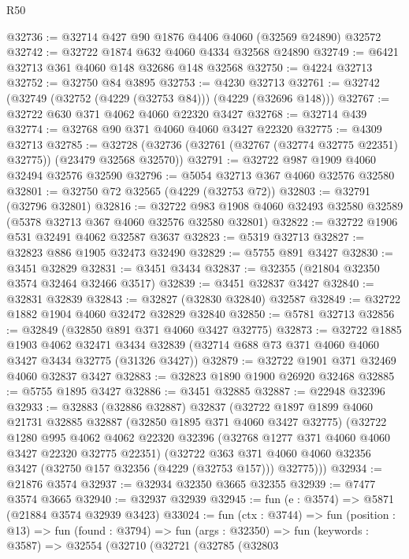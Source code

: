 \begin{lexlean}{R50}
\begin{coremodule}
@32736 := @32714 @427 @90 @1876 @4406 @4060 (@32569 @24890) @32572
@32742 := @32722 @1874 @632 @4060 @4334 @32568 @24890
@32749 := @6421 @32713 @361 @4060 @148 @32686 @148 @32568
@32750 := @4224 @32713
@32752 := @32750 @84 @3895
@32753 := @4230 @32713
@32761 := @32742 (@32749 (@32752 (@4229 (@32753 @84))) (@4229 (@32696 @148)))
@32767 := @32722 @630 @371 @4062 @4060 @22320 @3427
@32768 := @32714 @439
@32774 := @32768 @90 @371 @4060 @4060 @3427 @22320
@32775 := @4309 @32713
@32785 := @32728 (@32736 (@32761 (@32767 (@32774 @32775 @22351) @32775)) (@23479 @32568 @32570))
@32791 := @32722 @987 @1909 @4060 @32494 @32576 @32590
@32796 := @5054 @32713 @367 @4060 @32576 @32580
@32801 := @32750 @72 @32565 (@4229 (@32753 @72))
@32803 := @32791 (@32796 @32801)
@32816 := @32722
    @983
    @1908
    @4060
    @32493
    @32580
    @32589
    (@5378 @32713 @367 @4060 @32576 @32580 @32801)
@32822 := @32722 @1906 @531 @32491 @4062 @32587 @3637
@32823 := @5319 @32713
@32827 := @32823 @886 @1905 @32473 @32490
@32829 := @5755 @891 @3427
@32830 := @3451 @32829
@32831 := @3451 @3434
@32837 := @32355 (@21804 @32350 @3574 @32464 @32466 @3517)
@32839 := @3451 @32837 @3427
@32840 := @32831 @32839
@32843 := @32827 (@32830 @32840) @32587
@32849 := @32722 @1882 @1904 @4060 @32472 @32829 @32840
@32850 := @5781 @32713
@32856 := @32849 (@32850 @891 @371 @4060 @3427 @32775)
@32873 := @32722
    @1885
    @1903
    @4062
    @32471
    @3434
    @32839
    (@32714 @688 @73 @371 @4060 @4060 @3427 @3434 @32775 (@31326 @3427))
@32879 := @32722 @1901 @371 @32469 @4060 @32837 @3427
@32883 := @32823 @1890 @1900 @26920 @32468
@32885 := @5755 @1895 @3427
@32886 := @3451 @32885
@32887 := @22948 @32396
@32933 := @32883
    (@32886 @32887)
    @32837
    (@32722
      @1897
      @1899
      @4060
      @21731
      @32885
      @32887
      (@32850 @1895 @371 @4060 @3427 @32775)
      (@32722
        @1280
        @995
        @4062
        @4062
        @22320
        @32396
        (@32768 @1277 @371 @4060 @4060 @3427 @22320 @32775 @22351)
        (@32722
          @363
          @371
          @4060
          @4060
          @32356
          @3427
          (@32750 @157 @32356 (@4229 (@32753 @157)))
          @32775)))
@32934 := @21876 @3574
@32937 := @32934 @32350 @3665 @32355
@32939 := @7477 @3574 @3665
@32940 := @32937 @32939
@32945 := fun (e : @3574) => @5871 (@21884 @3574 @32939 @3423)
@33024 := fun (ctx : @3744) =>
  fun (position : @13) =>
  fun (found : @3794) =>
  fun (args : @32350) =>
  fun (keywords : @3587) =>
  @32554
    (@32710
      (@32721
        (@32785
          (@32803

\end{coremodule}
\end{lexlean}

